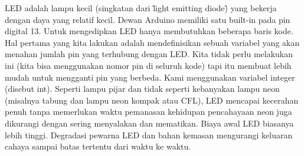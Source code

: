 LED adalah lampu kecil (singkatan dari \"light emitting diode\") yang bekerja dengan daya yang relatif kecil. Dewan Arduino memiliki satu built-in pada pin digital 13.
Untuk mengedipkan LED hanya membutuhkan beberapa baris kode. Hal pertama yang kita lakukan adalah mendefinisikan sebuah variabel yang akan menahan jumlah pin yang 
terhubung dengan LED. Kita tidak perlu melakukan ini (kita bisa menggunakan nomor pin di seluruh kode) tapi itu membuat lebih mudah untuk mengganti pin yang berbeda. 
Kami menggunakan variabel integer (disebut int). Seperti lampu pijar dan tidak seperti kebanyakan lampu neon (misalnya tabung dan lampu neon kompak atau CFL), LED mencapai kecerahan penuh tanpa memerlukan waktu pemanasan kehidupan pencahayaan neon juga dikurangi dengan sering menyalakan dan mematikan. Biaya awal LED biasanya lebih tinggi. Degradasi pewarna LED dan bahan kemasan mengurangi keluaran cahaya sampai batas tertentu dari waktu ke waktu.
